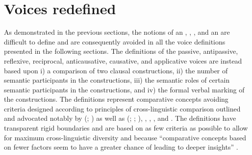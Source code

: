 \section{Voices redefined} \label{voices-redefined}
As demonstrated in the previous sections, the notions of an , , , and an  are difficult to define and are consequently avoided in all the voice definitions presented in the following sections. The definitions of the passive, antipassive, reflexive, reciprocal, anticausative, causative, and applicative voices are instead based upon i) a comparison of two clausal constructions, ii) the number of semantic participants in the constructions, iii) the semantic roles of certain semantic participants in the constructions, and iv) the formal verbal marking of the constructions. The definitions represent comparative concepts avoiding  criteria designed according to principles of cross-linguistic comparison outlined and advocated notably by \citeauthor{haspelmath:2010a} (\citeyear{haspelmath:2010a, haspelmath:2010b, haspelmath:2011a, haspelmath:2011b}; \citeyear{haspelmath:2014, haspelmath:2016a, haspelmath:2016b, haspelmath:2018}) as well as \citeauthor{croft:1990} (\citeyear[11f.]{croft:1990}; \citeyear[88]{croft:1995}; \citeyear[13f.]{croft:2003}), \citet{dryer:1997, dryer:2016}, \citet[22ff.]{givon:2001a}, \citet[10ff.]{song:2001}, and \citet{stassen:2010}. The definitions have transparent rigid boundaries and are based on as few criteria as possible to allow for maximum cross-linguistic diversity and because “comparative concepts based on fewer factors seem to have a greater chance of leading to deeper insights” \citep[677]{haspelmath:2010a}.

